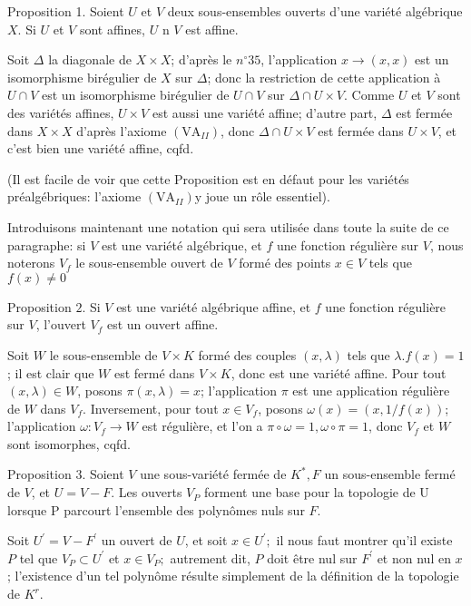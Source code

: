 Proposition 1. Soient $U$ et $V$ deux sous-ensembles ouverts d'une variété algébrique $X .$ Si $U$ et $V$ sont affines, $U$ n $V$ est affine.

Soit $\Delta$ la diagonale de $X \times X$; d'après le $n^{\circ} 35$, l'application $x \rightarrow(x, x)$ est un isomorphisme birégulier de $X$ sur $\Delta$; donc la restriction de cette application à $U \cap V$ est un isomorphisme birégulier de $U \cap V$ sur $\Delta \cap U \times V$. Comme $U$ et $V$ sont des variétés affines, $U \times V$ est aussi une variété affine; d'autre part, $\Delta$ est fermée dans $X \times X$ d'après l'axiome $\left(\mathrm{VA}_{I I}\right)$, donc $\Delta \cap U \times V$ est fermée dans $U \times V$, et c'est bien une variété affine, cqfd.

(Il est facile de voir que cette Proposition est en défaut pour les variétés préalgébriques: l'axiome $\left(\mathrm{VA}_{I I}\right) \mathrm{y}$ joue un rôle essentiel).

Introduisons maintenant une notation qui sera utilisée dans toute la suite de ce paragraphe: si $V$ est une variété algébrique, et $f$ une fonction régulière sur $V$, nous noterons $V_{f}$ le sous-ensemble ouvert de $V$ formé des points $x \in V$ tels que $f(x) \neq 0$

Proposition $2 .$ Si $V$ est une variété algébrique affine, et $f$ une fonction régulière sur $V$, l'ouvert $V_{f}$ est un ouvert affine.

Soit $W$ le sous-ensemble de $V \times K$ formé des couples $(x, \lambda)$ tels que $\lambda . f(x)=1$; il est clair que $W$ est fermé dans $V \times K$, donc est une variété affine. Pour tout $(x, \lambda) \in W$, posons $\pi(x, \lambda)=x$; l'application $\pi$ est une application régulière de $W$ dans $V_{f} .$ Inversement, pour tout $x \in V_{f}$, posons $\omega(x)=(x, 1 / f(x))$; l'application $\omega: V_{f} \rightarrow W$ est régulière, et l'on a $\pi \circ \omega=1, \omega \circ \pi=1$, donc $V_{f}$ et $W$ sont isomorphes, cqfd.

Proposition 3. Soient $V$ une sous-variété fermée de $K^{*}, F$ un sous-ensemble fermé de $V$, et $U=V-F$. Les ouverts $V_{P}$ forment une base pour la topologie de U lorsque P parcourt l'ensemble des polynômes nuls sur $F$.

Soit $U^{\prime}=V-F^{\prime}$ un ouvert de $U$, et soit $x \in U^{\prime} ;$ il nous faut montrer qu'il existe $P$ tel que $V_{P} \subset U^{\prime}$ et $x \in V_{P} ;$ autrement dit, $P$ doit être nul sur $F^{\prime}$ et non nul en $x$; l'existence d'un tel polynôme résulte simplement de la définition de la topologie de $K^{r}$.

